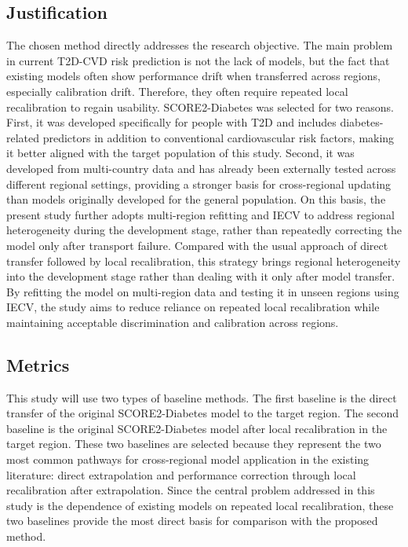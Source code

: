 \documentclass[conference]{IEEEtran}
\begin{document}
\subsection{Justification}
The chosen method directly addresses the research objective. The main problem in current T2D-CVD risk prediction is not the lack of models, but the fact that existing models often show performance drift when transferred across regions, especially calibration drift. Therefore, they often require repeated local recalibration to regain usability. SCORE2-Diabetes was selected for two reasons. First, it was developed specifically for people with T2D and includes diabetes-related predictors in addition to conventional cardiovascular risk factors, making it better aligned with the target population of this study. Second, it was developed from multi-country data and has already been externally tested across different regional settings, providing a stronger basis for cross-regional updating than models originally developed for the general population. On this basis, the present study further adopts multi-region refitting and IECV to address regional heterogeneity during the development stage, rather than repeatedly correcting the model only after transport failure. Compared with the usual approach of direct transfer followed by local recalibration, this strategy brings regional heterogeneity into the development stage rather than dealing with it only after model transfer. By refitting the model on multi-region data and testing it in unseen regions using IECV, the study aims to reduce reliance on repeated local recalibration while maintaining acceptable discrimination and calibration across regions.



\subsection{Metrics}
This study will use two types of baseline methods. The first baseline is the direct transfer of the original SCORE2-Diabetes model to the target region. The second baseline is the original SCORE2-Diabetes model after local recalibration in the target region. These two baselines are selected because they represent the two most common pathways for cross-regional model application in the existing literature: direct extrapolation and performance correction through local recalibration after extrapolation. Since the central problem addressed in this study is the dependence of existing models on repeated local recalibration, these two baselines provide the most direct basis for comparison with the proposed method.
\end{document}
